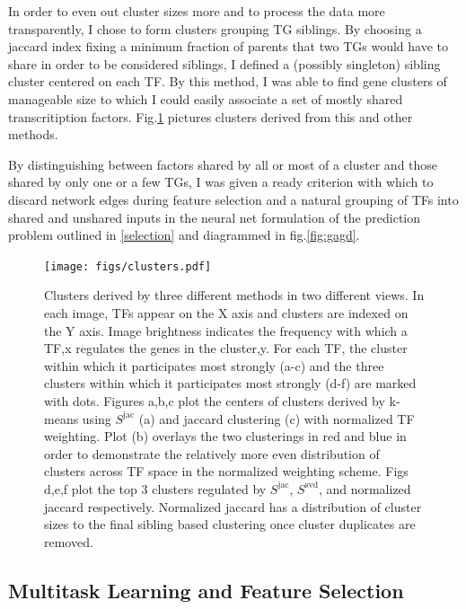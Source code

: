 \documentclass[12pt,a4paper]{article}
\begin{document}
\begin{multicols}{2}
In order to even out cluster sizes more and to process the data more transparently, I chose to form clusters grouping TG siblings. By choosing a jaccard index fixing a minimum fraction of parents that two TGs would have to share in order to be considered siblings, I defined a (possibly singleton) sibling cluster centered on each TF. By this method, I was able to find gene clusters of manageable size to which I could easily associate a set of mostly shared transcritiption factors. Fig.\ref{fig:clusters} pictures clusters derived from this and other methods. 

By distinguishing between factors shared by all or most of a cluster and those shared by only one or a few TGs, I was given a ready criterion with which to discard network edges during feature selection and a natural grouping of TFs into shared and unshared inputs in the neural net formulation of the prediction problem outlined in \ref{selection} and diagrammed in fig.\ref{fig:gagd}. 

\begin{figure}[h]
\texttt{[image: figs/clusters.pdf]}
\caption{Clusters derived by three different methods in two different views. In each image, TFs appear on the X axis and clusters are indexed on the Y axis. Image brightness indicates the frequency with which a TF,x regulates the genes in the cluster,y. For each TF, the cluster within which it participates most strongly (a-c) and the three clusters within which it participates most strongly (d-f) are marked with dots. 
Figures a,b,c plot the centers of clusters derived by k-means using $S^{\text{jac}}$ (a) and jaccard clustering (c) with normalized TF weighting. Plot (b) overlays the two clusterings in red and blue in order to demonstrate the relatively more even distribution of clusters across TF space in the normalized weighting scheme. Figs d,e,f plot the top 3 clusters regulated by $S^{\text{jac}}$, $S^{\text{svd}}$, and normalized jaccard respectively. Normalized jaccard has a distribution of cluster sizes to the final sibling based clustering once cluster duplicates are removed.}
\label{fig:clusters}
\end{figure} 

\subsection{Multitask Learning and Feature Selection}\label{FS}


\end{multicols}
\end{document}

